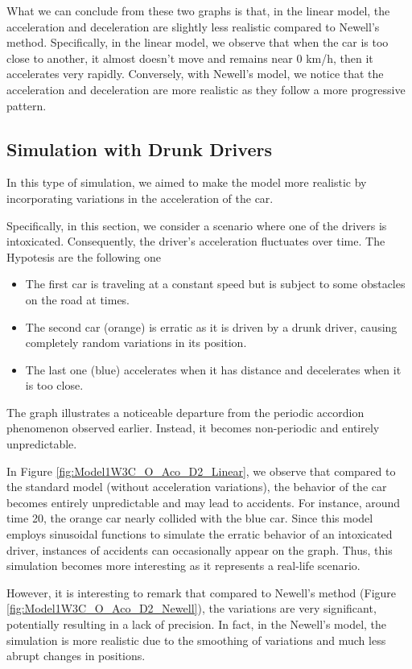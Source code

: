 \documentclass{article}
\begin{document}
		What we can conclude from these two graphs is that, in the linear model, the acceleration and deceleration are slightly less realistic compared to Newell's method. Specifically, in the linear model, we observe that when the car is too close to another, it almost doesn't move and remains near 0 km/h, then it accelerates very rapidly. Conversely, with Newell's model, we notice that the acceleration and deceleration are more realistic as they follow a more progressive pattern.
		
		\subsection{Simulation with Drunk Drivers}
		
		In this type of simulation, we aimed to make the model more realistic by incorporating variations in the acceleration of the car.
		
		Specifically, in this section, we consider a scenario where one of the drivers is intoxicated. Consequently, the driver's acceleration fluctuates over time. The Hypotesis are the following one 
		\begin{itemize}
			\item The first car is traveling at a constant speed but is subject to some obstacles on the road at times.
			\item The second car (orange) is erratic as it is driven by a drunk driver, causing completely random variations in its position.
			\item The last one (blue) accelerates when it has distance and decelerates when it is too close.
		\end{itemize}
		The graph illustrates a noticeable departure from the periodic accordion phenomenon observed earlier. Instead, it becomes non-periodic and entirely unpredictable.
		
		In Figure \ref{fig:Model1W3C_O_Aco_D2_Linear}, we observe that compared to the standard model (without acceleration variations), the behavior of the car becomes entirely unpredictable and may lead to accidents. For instance, around time 20, the orange car nearly collided with the blue car. Since this model employs sinusoidal functions to simulate the erratic behavior of an intoxicated driver, instances of accidents can occasionally appear on the graph. Thus, this simulation becomes more interesting as it represents a real-life scenario.
		
		However, it is interesting to remark that compared to Newell's method (Figure \ref{fig:Model1W3C_O_Aco_D2_Newell}), the variations are very significant, potentially resulting in a lack of precision. In fact, in the Newell's model, the simulation is more realistic due to the smoothing of variations and much less abrupt changes in positions.
		
\end{document}
